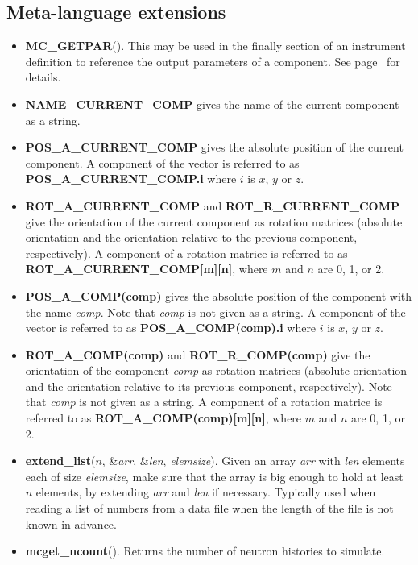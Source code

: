 \subsection{Meta-language extensions}
\begin{itemize}
\item {\bf MC\_GETPAR}(). This may be used in the finally section of an
  instrument definition to reference the output parameters of a
  component. See page~\pageref{mcgetpar} for details.
\item {\bf NAME\_CURRENT\_COMP} gives the name of the current component as a string.
\item {\bf POS\_A\_CURRENT\_COMP} gives the absolute position of the 
  current component. A component of the vector is referred to as
  {\bf POS\_A\_CURRENT\_COMP.i} where $i$ is $x$, $y$ or $z$.
\item {\bf ROT\_A\_CURRENT\_COMP} and 
  {\bf ROT\_R\_CURRENT\_COMP} give the orientation
  of the current component as rotation matrices
  (absolute orientation and the orientation relative to
  the previous component, respectively). A
  component of a rotation matrice is referred to as 
  {\bf ROT\_A\_CURRENT\_COMP[m][n]}, where $m$ and
  $n$ are 0, 1, or 2.
\item {\bf POS\_A\_COMP(comp)} gives the absolute position
  of the component with the name {\em comp}. Note that
  {\em comp} is not given as a string. A component of the
  vector is referred to as {\bf POS\_A\_COMP(comp).i}
  where $i$ is $x$, $y$ or $z$.
\item {\bf ROT\_A\_COMP(comp)} and
  {\bf ROT\_R\_COMP(comp)} give the orientation of the
  component {\em comp} as rotation matrices (absolute
  orientation and the orientation relative to its
  previous component, respectively). Note that {\em comp}
  is not given as a string. A component of  a rotation
  matrice is referred to as 
  {\bf ROT\_A\_COMP(comp)[m][n]}, where $m$ and $n$ are
  0, 1, or 2. 
\item {\bf extend\_list}($n$, \&\textit{arr}, \&\textit{len},
  \textit{elemsize}). Given an array \textit{arr} with \textit{len}
  elements each of size \textit{elemsize}, make sure that the array is
  big enough to hold at least $n$ elements, by extending \textit{arr}
  and \textit{len} if necessary. Typically used when reading a list of
  numbers from a data file when the length of the file is not known in advance.
\item {\bf mcget\_ncount}(). Returns the number of neutron histories to simulate.
\end{itemize}

